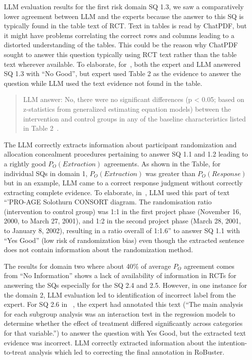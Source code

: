 \documentclass[sn-mathphys,Numbered]{sn-jnl}%
\theoremstyle{thmstyleone}%
\theoremstyle{thmstyletwo}%
\theoremstyle{thmstylethree}%
\begin{document}
LLM evaluation results for the first risk domain SQ 1.3, we saw a comparatively lower agreement between LLM and the experts because the answer to this SQ is typically found in the table text of RCT.
Text in tables is read by ChatPDF, but it might have problems correlating the correct rows and columns leading to a distorted understanding of the tables.
This could be the reason why ChatPDF sought to answer this question typically using RCT text rather than the table text wherever available.
To elaborate, for~\cite{stuck2015effect}, both the expert and LLM answered SQ 1.3 with ``No Good'', but expert used Table 2 as the evidence to answer the question while LLM used the text evidence not found in the table.

\begin{quote}
    LLM answer: No, there were no significant differences (p < 0.05; based on z-statistics from generalized estimating equation models) between the intervention and control groups in any of the baseline characteristics listed in Table 2~\cite{stuck2015effect}.
\end{quote}

The LLM correctly extracts information about participant randomization and allocation concealment procedures pertaining to answer SQ 1.1 and 1.2 leading to a rightly good $P_{O} (Extraction)$ agreements. 
As shown in the Table, for individual SQs in domain 1, $P_{O} (Extraction)$ was greater than $P_{O} (Response)$ but in an example, LLM came to a correct response judgment without correctly extracting complete evidence.
To elaborate, in~\cite{stuck2015effect}, LLM used this part of text ``'PRO-AGE Solothurn CONSORT diagram. The randomisation ratio (intervention to control group) was 1:1 in the first project phase (November 16, 2000, to March 27, 2001), and 1:2 in the second project phase (March 28, 2001, to January 8, 2002), resulting in a ratio overall of 1:1.6'' to answer SQ 1.1 with ``Yes Good'' (low risk of randomization bias) even though the extracted sentence does not contain information about the randomization method.


The results for domain two where about 40\% of average $P_{O}$ agreement comes from ``No Information'' shows a lack of availability of information in RCTs for answering the SQs especially for the SQ 2.4 and 2.5.
However, in one instance for the domain 2, LLM evaluation led to identification of incorrect label from the expert. 
For SQ 2.6 in ~\cite{hassett2020digitally}, the expert had annotated this text (``The main analysis for each subgroup analysis was an interaction test in the regression models to determine whether the effect of treatment differed significantly across categories for that variable.'') to answer the question with Yes Good, but the extracted text evidence was incorrect.
LLM correctly extracted information about the intention-to-treat analysis which led to correcting the final annotation in RoBuster.
\end{document}
